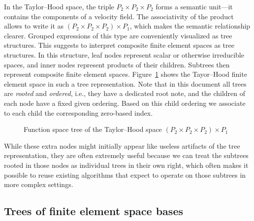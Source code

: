 \documentclass[a4paper,10pt,headings=normal,bibliography=totoc]{scrartcl}
\begin{document}
In the Taylor--Hood space, the triple
$P_2 \times P_2 \times P_2$ forms a semantic unit---it contains the components of a velocity field.
The associativity of the product allows to write it
as $(P_2 \times P_2 \times P_2) \times P_1$, which makes the semantic relationship clearer.
Grouped expressions of this type are conveniently visualized as tree structures.  This
suggests to interpret composite
finite element spaces as tree structures.  In this structure, leaf nodes represent scalar or otherwise irreducible spaces,
and inner nodes represent products of their children.  Subtrees then represent composite
finite element spaces.  Figure~\ref{fig:taylor_hood_space_tree} shows the Tayor--Hood finite element
space in such a tree representation. Note that in this document all trees are \emph{rooted} and \emph{ordered},
i.e., they have a dedicated root note, and the children of each node have a fixed given ordering.
Based on this child ordering we associate to each child the corresponding zero-based index.

\begin{figure}
    \begin{center}
    \end{center}
    \caption{Function space tree of the Taylor--Hood space $(P_2 \times P_2 \times P_2)\times P_1$}
    \label{fig:taylor_hood_space_tree}
\end{figure}

While these extra nodes might initially appear like useless artifacts of the tree representation, they are often extremely useful
because we can treat the subtrees rooted in those nodes as individual trees in their own right, which often makes it possible to
reuse existing algorithms that expect to operate on those subtrees in more complex settings.


\subsection{Trees of finite element space bases}
\label{sec:basistree}
\end{document}
